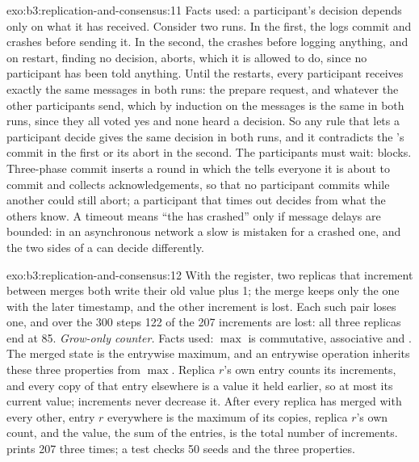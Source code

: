 \begin{solution}{exo:b3:replication-and-consensus:11}
Facts used: a participant's decision depends only on what it has received. Consider two runs. In the first, the  logs commit and crashes before sending it. In the second, the  crashes before logging anything, and on restart, finding no decision, aborts, which it is allowed to do, since no participant has been told anything. Until the  restarts, every participant receives exactly the same messages in both runs: the prepare request, and whatever the other participants send, which by induction on the messages is the same in both runs, since they all voted yes and none heard a decision. So any rule that lets a participant decide gives the same decision in both runs, and it contradicts the 's commit in the first or its abort in the second. The participants must wait:  blocks. Three-phase commit inserts a round in which the  tells everyone it is about to commit and collects acknowledgements, so that no participant commits while another could still abort; a participant that times out decides from what the others know. A timeout means ``the  has crashed'' only if message delays are bounded: in an asynchronous network a slow  is mistaken for a crashed one, and the two sides of a  can decide differently.
\end{solution}

\begin{solution}{exo:b3:replication-and-consensus:12}
With the register, two replicas that increment between merges both write their old value plus 1; the merge keeps only the one with the later timestamp, and the other increment is lost. Each such pair loses one, and over the 300 steps 122 of the 207 increments are lost: all three replicas end at 85. \emph{Grow-only counter.} Facts used: $\max$ is commutative, associative and . The merged state is the entrywise maximum, and an entrywise operation inherits these three properties from $\max$. Replica $r$'s own entry counts its increments, and every copy of that entry elsewhere is a value it held earlier, so at most its current value; increments never decrease it. After every replica has merged with every other, entry $r$ everywhere is the maximum of its copies, replica $r$'s own count, and the value, the sum of the entries, is the total number of increments.  prints 207 three times; a test checks 50 seeds and the three properties.
\end{solution}

